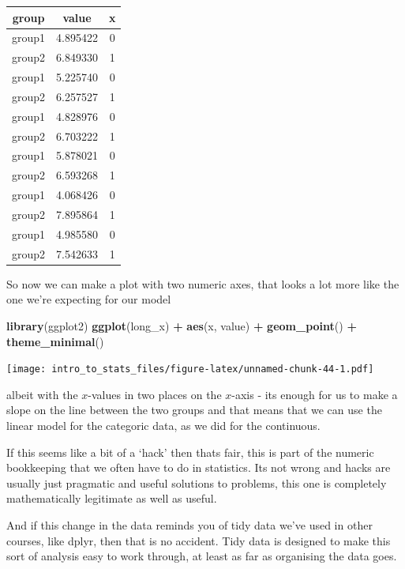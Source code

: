 \documentclass[
]{book}
\newenvironment{Shaded}{\begin{snugshade}}{\end{snugshade}}
\newcommand{\KeywordTok}[1]{\textcolor[rgb]{0.13,0.29,0.53}{\textbf{#1}}}
\newcommand{\NormalTok}[1]{#1}
\newcommand{\OperatorTok}[1]{\textcolor[rgb]{0.81,0.36,0.00}{\textbf{#1}}}
\newcommand{\StringTok}[1]{\textcolor[rgb]{0.31,0.60,0.02}{#1}}
\begin{document}
\begin{tabular}{c|c|c}
\hline
group & value & x\\
\hline
group1 & 4.895422 & 0\\
\hline
group2 & 6.849330 & 1\\
\hline
group1 & 5.225740 & 0\\
\hline
group2 & 6.257527 & 1\\
\hline
group1 & 4.828976 & 0\\
\hline
group2 & 6.703222 & 1\\
\hline
group1 & 5.878021 & 0\\
\hline
group2 & 6.593268 & 1\\
\hline
group1 & 4.068426 & 0\\
\hline
group2 & 7.895864 & 1\\
\hline
group1 & 4.985580 & 0\\
\hline
group2 & 7.542633 & 1\\
\hline
\end{tabular}

So now we can make a plot with two numeric axes, that looks a lot more like the one we're expecting for our model

\begin{Shaded}
\begin{Highlighting}[]
\KeywordTok{library}\NormalTok{(ggplot2)}
  \KeywordTok{ggplot}\NormalTok{(long_x) }\OperatorTok{+}\StringTok{ }\KeywordTok{aes}\NormalTok{(x, value) }\OperatorTok{+}\StringTok{ }\KeywordTok{geom_point}\NormalTok{() }\OperatorTok{+}\StringTok{ }\KeywordTok{theme_minimal}\NormalTok{() }
\end{Highlighting}
\end{Shaded}

\texttt{[image: intro\_to\_stats\_files/figure-latex/unnamed-chunk-44-1.pdf]}

albeit with the \(x\)-values in two places on the \(x\)-axis - its enough for us to make a slope on the line between the two groups and that means that we can use the linear model for the categoric data, as we did for the continuous.

If this seems like a bit of a `hack' then thats fair, this is part of the numeric bookkeeping that we often have to do in statistics. Its not wrong and hacks are usually just pragmatic and useful solutions to problems, this one is completely mathematically legitimate as well as useful.

And if this change in the data reminds you of tidy data we've used in other courses, like dplyr, then that is no accident. Tidy data is designed to make this sort of analysis easy to work through, at least as far as organising the data goes.
\end{document}
